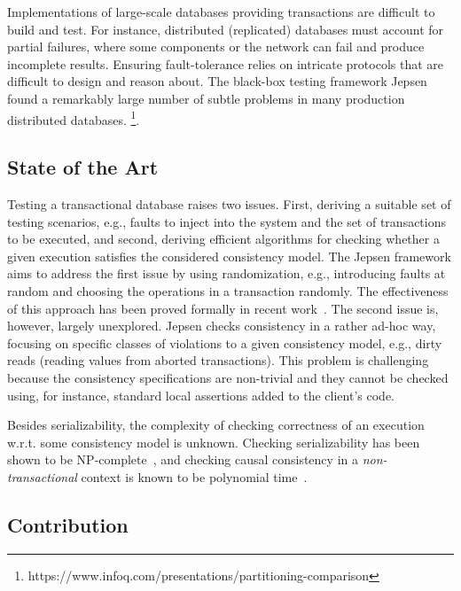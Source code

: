 Implementations of large-scale databases providing transactions are difficult to build and test. For instance, distributed (replicated) databases must account for partial failures, where some components or the network can fail and produce incomplete results. Ensuring fault-tolerance relies on intricate protocols that are difficult to design and reason about. The black-box testing framework Jepsen~\cite{jepsen} found a remarkably large number of subtle problems in many production distributed databases. \footnote{https://www.infoq.com/presentations/partitioning-comparison}.

\subsection{State of the Art}

Testing a transactional database raises two issues. First, deriving a suitable set of testing scenarios, e.g., faults to inject into the system and the set of transactions to be executed, and second, deriving efficient algorithms for checking whether a given execution satisfies the considered consistency model. The Jepsen framework aims to address the first issue by using randomization, 
e.g., introducing faults at random and choosing the operations in a transaction randomly. The effectiveness of this approach has been proved formally in recent work~\cite{DBLP:journals/pacmpl/OzkanMNBW18}. The second issue is, however, largely unexplored. Jepsen checks consistency in a rather ad-hoc way, focusing on specific classes of violations to a given consistency model, e.g., dirty reads (reading values from aborted transactions). This problem is challenging because the consistency specifications are non-trivial and they cannot be checked using, for instance, standard local assertions added to the client's code. 

Besides serializability, the complexity of checking correctness of an execution w.r.t. some consistency model is unknown. Checking serializability has been shown to be NP-complete~\cite{DBLP:journals/jacm/Papadimitriou79b}, and checking causal consistency in a \emph{non-transactional} context is known to be polynomial time~\cite{DBLP:conf/popl/BouajjaniEGH17}.

\subsection{Contribution}

